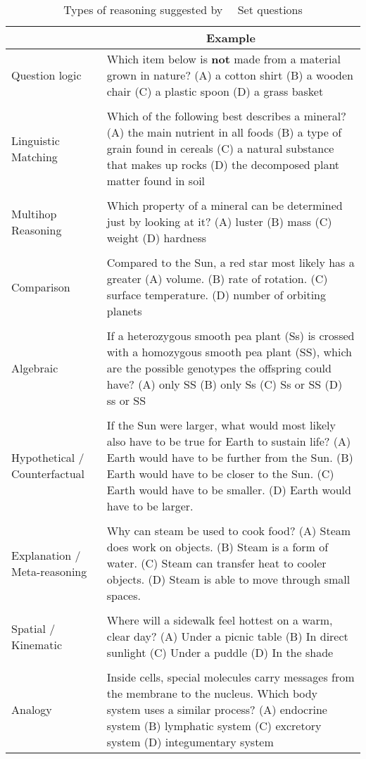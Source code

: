 \begin{table*}[htb]
\setlength{\tabcolsep}{4pt}
\setlength{\doublerulesep}{\arrayrulewidth}
\small
\centering
 \begin{tabular}{|>{\raggedright\arraybackslash}p{18ex}|p{80ex}|} \hline
{\bf Reasoning Type} \bigstrut[t] & \multicolumn{1}{c|}{\bf Example} \\ \hline \hline
Question logic \bigstrut[t] &
Which item below is {\bf not} made from a material grown in nature? (A) a cotton shirt (B) a wooden chair (C) a plastic spoon (D) a grass basket \\
& \\
Linguistic Matching 
& Which of the following best describes a mineral? (A) the main nutrient in all foods (B) a type of grain found in cereals (C) a natural substance that makes up rocks (D) the decomposed plant matter found in soil \\
& \\ 
Multihop Reasoning &
Which property of a mineral can be determined just by looking at it? (A) luster (B) mass (C) weight (D) hardness \\
\\
Comparison
& Compared to the Sun, a red star most likely has a greater (A) volume. (B) rate of rotation. (C) surface temperature. (D) number of orbiting planets \\
 & \\
Algebraic &
If a heterozygous smooth pea plant (Ss) is crossed with a homozygous smooth pea plant (SS), which are the possible genotypes the offspring could have? (A) only SS (B) only Ss (C) Ss or SS (D) ss or SS \\
& \\
Hypothetical / Counterfactual
& If the Sun were larger, what would most likely also have to be true for Earth to sustain life? (A) Earth would have to be further from the Sun. (B) Earth would have to be closer to the Sun. (C) Earth would have to be smaller. (D) Earth would have to be larger. \\
 & \\
Explanation / {Meta-reasoning} &
Why can steam be used to cook food? (A) Steam does work on objects. (B) Steam is a form of water. (C) Steam can transfer heat to cooler objects. (D) Steam is able to move through small spaces. \\
 & \\
Spatial / Kinematic &
Where will a sidewalk feel hottest on a warm, clear day? (A) Under a picnic table (B) In direct sunlight (C) Under a puddle (D) In the shade \\ 
& \\
Analogy &
Inside cells, special molecules carry messages from the membrane to the nucleus. Which body system uses a similar process? (A) endocrine system (B) lymphatic system (C) excretory system (D) integumentary system \\ \hline
 \end{tabular}
\caption{Types of reasoning suggested by \ASC~\Challenge~Set questions}
\label{reasoning-types}
\end{table*}

